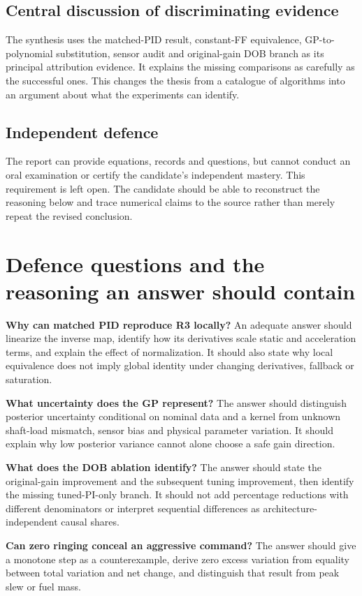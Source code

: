 \subsection{Central discussion of discriminating evidence}
The synthesis uses the matched-PID result, constant-FF equivalence, GP-to-polynomial substitution, sensor audit and original-gain DOB branch as its principal attribution evidence. It explains the missing comparisons as carefully as the successful ones. This changes the thesis from a catalogue of algorithms into an argument about what the experiments can identify.

\subsection{Independent defence}
The report can provide equations, records and questions, but cannot conduct an oral examination or certify the candidate's independent mastery. This requirement is left open. The candidate should be able to reconstruct the reasoning below and trace numerical claims to the source rather than merely repeat the revised conclusion.

\section{Defence questions and the reasoning an answer should contain}
\textbf{Why can matched PID reproduce R3 locally?} An adequate answer should linearize the inverse map, identify how its derivatives scale static and acceleration terms, and explain the effect of normalization. It should also state why local equivalence does not imply global identity under changing derivatives, fallback or saturation.

\textbf{What uncertainty does the GP represent?} The answer should distinguish posterior uncertainty conditional on nominal data and a kernel from unknown shaft-load mismatch, sensor bias and physical parameter variation. It should explain why low posterior variance cannot alone choose a safe gain direction.

\textbf{What does the DOB ablation identify?} The answer should state the original-gain improvement and the subsequent tuning improvement, then identify the missing tuned-PI-only branch. It should not add percentage reductions with different denominators or interpret sequential differences as architecture-independent causal shares.

\textbf{Can zero ringing conceal an aggressive command?} The answer should give a monotone step as a counterexample, derive zero excess variation from equality between total variation and net change, and distinguish that result from peak slew or fuel mass.

